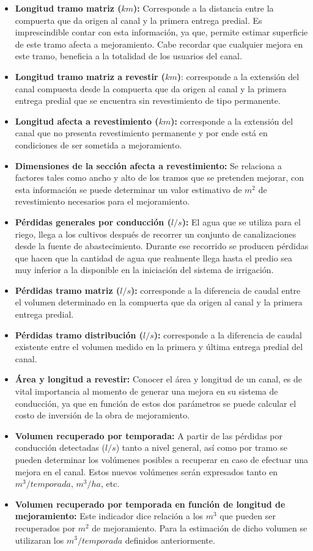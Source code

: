 \documentclass[]{article}
\begin{document}
\begin{itemize}
\item \textbf{Longitud tramo matriz ($km$):} Corresponde a la distancia entre la compuerta que da origen al canal y la primera entrega predial. Es imprescindible contar con esta información, ya que, permite estimar superficie de este tramo afecta a mejoramiento. Cabe recordar que cualquier mejora en este tramo, beneficia a la totalidad de los usuarios del canal.
\item \textbf{Longitud tramo matriz a revestir ($km$)}: corresponde a la extensión del canal compuesta desde la compuerta que da origen al canal y la primera entrega predial que se encuentra sin revestimiento de tipo permanente.
\item \textbf{Longitud afecta a revestimiento ($km$):} corresponde a la extensión del canal que no presenta revestimiento permanente y por ende está en condiciones de ser sometida a mejoramiento.
\item \textbf{Dimensiones de la sección afecta a revestimiento:} Se relaciona a factores tales como ancho y alto de los tramos que se pretenden mejorar, con esta información se puede determinar un valor estimativo de $m^2$ de revestimiento necesarios para el mejoramiento.
\item \textbf{Pérdidas generales por conducción ($l/s$):} El agua que se utiliza para el riego, llega a los cultivos después de recorrer un conjunto de canalizaciones desde la fuente de abastecimiento. Durante ese recorrido se producen pérdidas que hacen que la cantidad de agua que realmente llega hasta el predio sea muy inferior a la disponible en la iniciación del sistema de irrigación.
\item \textbf{Pérdidas tramo matriz ($l/s$):} corresponde a la diferencia de caudal entre el volumen determinado en la compuerta que da origen al canal y la primera entrega predial.
\item \textbf{Pérdidas tramo distribución ($l/s$):} corresponde a la diferencia de caudal existente entre el volumen medido en la primera y última entrega predial del canal.
\item \textbf{Área y longitud a revestir:} Conocer el área y longitud de un canal, es de vital importancia al momento de generar una mejora en su sistema de conducción, ya que en función de estos dos parámetros se puede calcular el costo de inversión de la obra de mejoramiento.
\item \textbf{Volumen recuperado por temporada:} A partir de las pérdidas por conducción detectadas ($l/s$) tanto a nivel general, así como por tramo se pueden determinar los volúmenes posibles a recuperar en caso de efectuar una mejora en el canal. Estos nuevos volúmenes serán expresados tanto en $m^3/temporada$, $m^3/ha$, etc.
\item \textbf{Volumen recuperado por temporada en función de longitud de mejoramiento:} Este indicador dice relación a los $m^3$ que pueden ser recuperados por $m^2$ de mejoramiento. Para la estimación de dicho volumen se utilizaran los $m^3/temporada$ definidos anteriormente.
\end{itemize}
\end{document}
